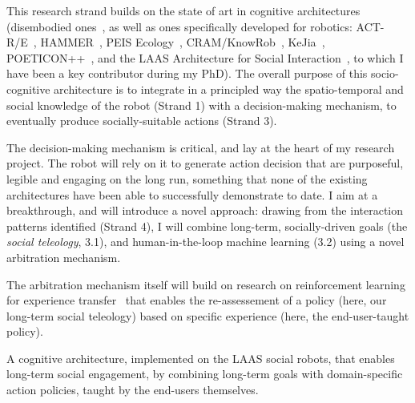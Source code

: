 This research strand builds on the state of art in cognitive architectures
(disembodied
ones~\parencite{chong2007integrated,vernon2007survey,kingdon2008review,duch2008cognitive,langley2009cognitive,taatgen2010past,thorisson2012cognitive},
as well as ones specifically developed for robotics:
ACT-R/E~\parencite{trafton2013act}, HAMMER~\parencite{demiris2006hierarchical},
PEIS Ecology~\parencite{saffiotti2005peis,daoutis2012cooperative},
CRAM/KnowRob~\parencite{beetz2010cram, tenorth2009knowrob},
KeJia~\parencite{chen2010developing}, POETICON++~\parencite{antunes2016from}, and
the LAAS Architecture for Social
Interaction~\parencite{lemaignan2017artificial}, to which I have been a key
contributor during my PhD). The overall purpose of this
socio-cognitive architecture is to integrate in a principled way the
spatio-temporal and social knowledge of the robot (Strand 1) with a decision-making
mechanism, to eventually produce socially-suitable actions (Strand 3). 

The decision-making mechanism is critical, and lay at the heart of my research
project. The robot will rely on it to generate action decision that are
purposeful, legible and engaging on the long run, something that none of the
existing architectures have been able to successfully demonstrate to date. I aim
at a breakthrough, and will introduce a novel approach: drawing from the
interaction patterns identified (Strand 4), I will combine long-term,
socially-driven goals (the \emph{social teleology}, 3.1), and human-in-the-loop
machine learning (3.2) using a novel arbitration mechanism.

The arbitration mechanism itself will build on research on reinforcement
learning for experience transfer~\parencite{madden2004transfer} that enables the
re-assessement of a policy (here, our long-term social teleology) based on
specific experience (here, the end-user-taught policy).


\begin{outcome}{3.3}
A cognitive architecture, implemented
    on the LAAS social robots, that enables long-term social engagement, by combining
    long-term goals with domain-specific action policies, taught by the
    end-users themselves.
\end{outcome}



